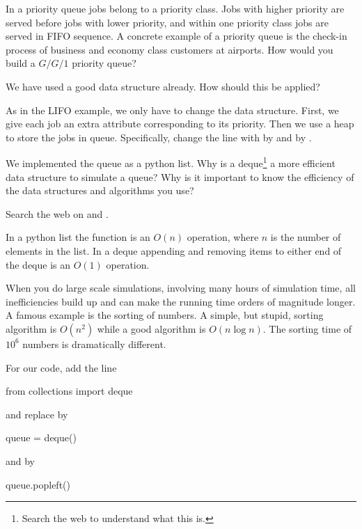 \begin{exercise}
  In a priority queue  jobs belong to a priority class. Jobs with higher priority are served before jobs with lower priority, and within one priority class jobs are served in FIFO sequence. A concrete example of a priority queue is the check-in process of business and economy class customers at airports.  How would you build a $G/G/1$ priority queue?
\begin{hint}
We have used a good data structure already. How should this be applied?
\end{hint}
\begin{solution}
  As in the LIFO example, we only have to change the data structure. First, we give each job an extra attribute corresponding to its priority. Then we use a heap to store the jobs in queue. Specifically,  change the line with
   by
and  by .

\end{solution}
\end{exercise}

\begin{exercise}

  We implemented the queue as a python list. Why is a deque\footnote{Search the web to understand what this is.} a more efficient data structure to simulate a queue?  Why is it important to know the efficiency of the data structures and algorithms you use?
\begin{hint}
  Search the web on  and .
\end{hint}
\begin{solution}
    In a python list the  function is an $O(n)$ operation, where $n$ is the number of elements in the list. In a deque appending and removing items to either end of the deque is an $O(1)$ operation.

When you do large scale simulations, involving many hours of simulation time, all inefficiencies build up and can make the running time orders of magnitude longer. A famous example is the sorting of numbers. A simple, but stupid, sorting algorithm is $O(n^2)$ while a good algorithm is $O(n \log n)$. The sorting time of $10^6$ numbers is dramatically different.

For our code, add the line
\begin{pynotangle}
from collections import deque
\end{pynotangle}
and replace  by
\begin{pynotangle}
queue = deque()
\end{pynotangle}
and   by
\begin{pynotangle}
queue.popleft()
\end{pynotangle}
  \end{solution}
\end{exercise}

